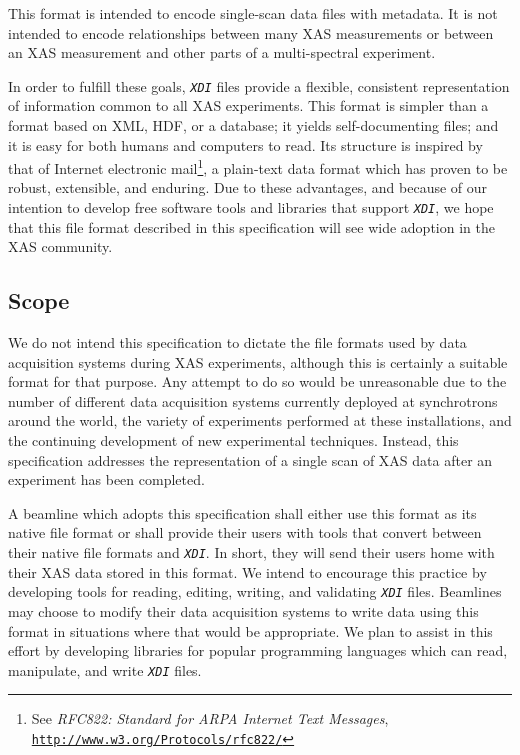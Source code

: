 \documentclass{article}
\newcommand{\sltt}[1]{\texttt{\textsl{#1}}}
\newcommand{\xdi}{\sltt{XDI}}
\begin{document}
This format is intended to encode single-scan data files with
metadata.  It is not intended to encode relationships between many XAS
measurements or between an XAS measurement and other parts of a
multi-spectral experiment.

In order to fulfill these goals, {\xdi} files provide a flexible,
consistent representation of information common to all XAS
experiments.  This format is simpler than a format based on XML, HDF,
or a database; it yields self-documenting files; and it is easy for
both humans and computers to read.  Its structure is inspired by that
of Internet electronic mail\footnote{See \textit{RFC822: Standard for
    ARPA Internet Text Messages},
  \href{http://www.w3.org/Protocols/rfc822/}
  {\texttt{http://www.w3.org/Protocols/rfc822/}}}, a plain-text data
format which has proven to be robust, extensible, and enduring.  Due
to these advantages, and because of our intention to develop free
software tools and libraries that support {\xdi}, we hope that this
file format described in this specification will see wide adoption in
the XAS community.


\subsection{Scope}
\label{sec:scope}

We do not intend this specification to dictate the file formats used
by data acquisition systems during XAS experiments, although this is
certainly a suitable format for that purpose.  Any attempt to do
so would be unreasonable due to the number of different data
acquisition systems currently deployed at synchrotrons around the
world, the variety of experiments performed at these installations,
and the continuing development of new experimental techniques.
Instead, this specification addresses the representation of a single
scan of XAS data after an experiment has been completed.

A beamline which adopts this specification shall either use this
format as its native file format or shall provide their users with
tools that convert between their native file formats and {\xdi}.  In
short, they will send their users home with their XAS data stored in
this format.  We intend to encourage this practice by developing tools
for reading, editing, writing, and validating {\xdi} files.  Beamlines
may choose to modify their data acquisition systems to write data
using this format in situations where that would be appropriate.  We
plan to assist in this effort by developing libraries for popular
programming languages which can read, manipulate, and write {\xdi}
files.
\end{document}
